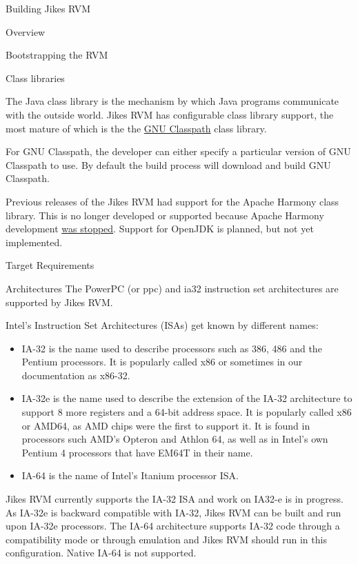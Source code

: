 \begin{section}{Building Jikes RVM}
\begin{subsection}{Overview}
\begin{subsubsection}{Bootstrapping the RVM}
\end{subsubsection}

\begin{subsubsection}{Class libraries}

The Java class library is the mechanism by which Java programs communicate with the outside world. Jikes RVM has configurable class library support, the most mature of which is the the \href{http://www.gnu.org/software/classpath/}{GNU Classpath} class library.

For GNU Classpath, the developer can either specify a particular version of GNU Classpath to use. By default the build process will download and build GNU Classpath.

Previous releases of the Jikes RVM had support for the Apache Harmony class library. This is no longer developed or supported because Apache Harmony development \href{https://harmony.apache.org/}{was stopped}. Support for OpenJDK is planned, but not yet implemented.

\end{subsubsection}

\end{subsection}

\begin{subsection}{Target Requirements}

\begin{subsubsection}{Architectures }
The PowerPC (or ppc) and ia32 instruction set architectures are supported by Jikes RVM.

Intel's Instruction Set Architectures (ISAs) get known by different names:

\begin{itemize}
  \item IA-32 is the name used to describe processors such as 386, 486 and the Pentium processors. It is popularly called x86 or sometimes in our documentation as x86-32.
  \item IA-32e is the name used to describe the extension of the IA-32 architecture to support 8 more registers and a 64-bit address space. It is popularly called x86 or AMD64, as AMD chips were the first to support it. It is found in processors such AMD's Opteron and Athlon 64, as well as in Intel's own Pentium 4 processors that have EM64T in their name.
  \item IA-64 is the name of Intel's Itanium processor ISA.
\end{itemize}

Jikes RVM currently supports the IA-32 ISA and work on IA32-e is in progress. As IA-32e is backward compatible with IA-32, Jikes RVM can be built and run upon IA-32e processors. The IA-64 architecture supports IA-32 code through a compatibility mode or through emulation and Jikes RVM should run in this configuration. Native IA-64 is not supported.
\end{subsubsection}


\end{subsection}
\end{section}
